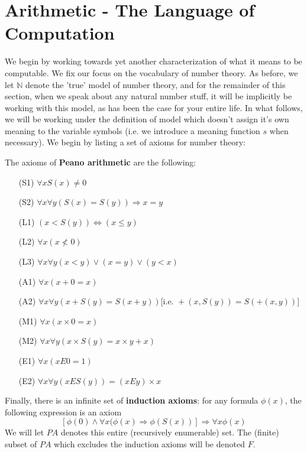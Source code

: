 \section{Arithmetic - The Language of Computation}
\par We begin by working towards yet another characterization of what it means to be computable. We fix our focus on the vocabulary of number theory. As before, we let $\mathbb{N}$ denote the 'true' model of number theory, and for the remainder of this section, when we speak about any natural number stuff, it will be implicitly be working with this model, as has been the case for your entire life. In what follows, we will be working under the definition of model which doesn't assign it's own meaning to the variable symbols (i.e. we introduce a meaning function $s$ when necessary).
We begin by listing a set of axioms for number theory:
\newpage
\begin{definition}
    The axioms of \textbf{Peano arithmetic} are the following:
    \begin{itemize}
        \item[(S1)] $\forall x S(x) \neq 0$
        \item[(S2)] $\forall x \forall y (S(x) = S(y)) \Rightarrow x = y$
        \item[(L1)] $(x < S(y)) \iff (x \leq y)$
        \item[(L2)] $\forall x( x \nless 0)$
        \item[(L3)] $\forall x \forall y (x < y) \vee (x=y) \vee (y < x)$
        \item[(A1)] $\forall x (x+0 = x)$
        \item[(A2)] $\forall x \forall y (x+S(y) = S(x+y)) \textrm{[i.e. } +(x,S(y)) = S(+(x,y))$\textrm{]}
        \item[(M1)] $\forall x (x \times 0 = x)$
        \item[(M2)] $\forall x \forall y (x \times S(y) = x \times y + x)$
        \item[(E1)] $\forall x (xE0 = 1)$
        \item[(E2)] $\forall x \forall y (x E S(y)) = (x E y) \times x$
    \end{itemize}
    Finally, there is an infinite set of \textbf{induction axioms}: for any formula $\phi(x)$, the following expression is an axiom \[[\phi(0) \wedge \forall x (\phi(x) \Rightarrow \phi(S(x))] \Rightarrow \forall x \phi(x) \]
    We will let $PA$ denotes this entire (recursively enumerable) set. The (finite) subset of $PA$ which excludes the induction axioms will be denoted $F$.  
\end{definition}
